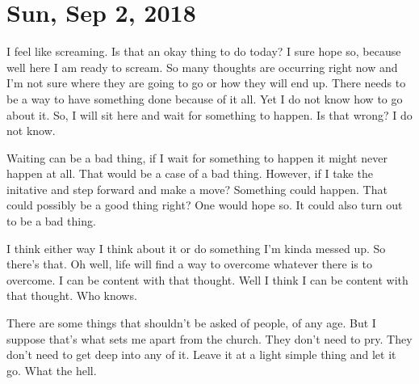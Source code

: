 \section{Sun, Sep 2, 2018}

I feel like screaming. Is that an okay thing to do today? I sure hope so, because
well here I am ready to scream. So many thoughts are occurring right now and I'm not
sure where they are going to go or how they will end up. There needs to be a way to
have something done because of it all. Yet I do not know how to go about it. So, I
will sit here and wait for something to happen. Is that wrong? I do not know.

Waiting can be a bad thing, if I wait for something to happen it might never happen
at all. That would be a case of a bad thing. However, if I take the initative and
step forward and make a move? Something could happen. That could possibly be a good
thing right? One would hope so. It could also turn out to be a bad thing.

I think either way I think about it or do something I'm kinda messed up. So there's
that. Oh well, life will find a way to overcome whatever there is to overcome. I can
be content with that thought. Well I think I can be content with that thought. Who
knows.

There are some things that shouldn't be asked of people, of any age. But I suppose
that's what sets me apart from the church. They don't need to pry. They don't need to
get deep into any of it. Leave it at a light simple thing and let it go. What the
hell.